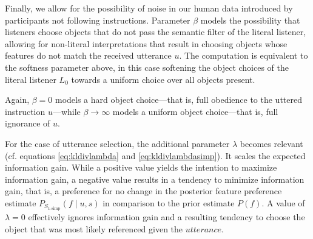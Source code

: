 \documentclass[10pt,a4paper]{article}
\begin{document}


Finally, we allow for the possibility of noise in our human data introduced by participants not following instructions.
Parameter $\beta$ models the possibility that listeners choose objects that do not pass the semantic filter of the literal listener, allowing for non-literal interpretations that result in choosing objects whose features do not match the received utterance $u$. 
The computation is equivalent to the softness parameter above, in this case softening the object choices of the literal listener $L_0$ towards a uniform choice over all objects present. 

Again, $\beta=0$ models a hard object choice---that is, full obedience to the uttered instruction $u$---while $\beta \rightarrow \infty$ models a uniform object choice---that is, full ignorance of $u$.


For the case of utterance selection, the additional parameter $\lambda$ becomes relevant
(cf. equations \ref{eq:kldivlambda} and \ref{eq:kldivlambdasimp}). 
It scales the expected information gain. 
While a positive value yields the intention to maximize information gain, 
a negative value results in a tendency to minimize information gain, that is, a preference for no change in the posterior feature preference estimate $P_{S_{1\textrm{-simp}}}(f\mid u,s)$ in comparison to the prior estimate $P(f)$. 
A value of $\lambda=0$ effectively ignores information gain and a resulting tendency to choose the object that was most likely referenced given the $utterance$.
\end{document}
